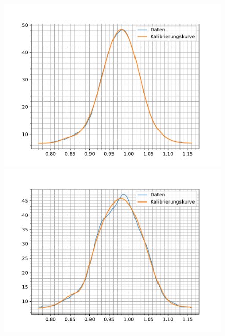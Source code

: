 \documentclass{article}
\begin{document}
\begin{figure}[h]
  \centering
  \begin{minipage}{.49\linewidth}
    \centering
    \includegraphics[width=\linewidth]{gauss_2.0A.pdf}
  \end{minipage}
  \hfill
  \begin{minipage}{.49\linewidth}
    \centering
    \includegraphics[width=\linewidth]{gauss_3.0A.pdf}
  \end{minipage}


\end{figure}
\end{document}
